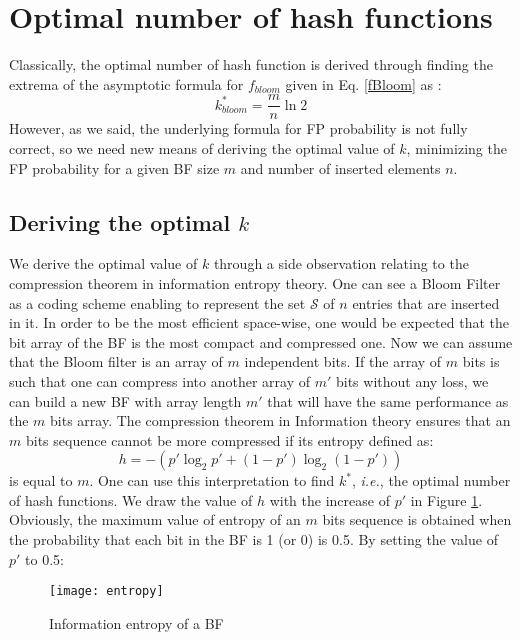 \section{Optimal number of hash functions}
\label{sec:optimalk}
Classically, the optimal number of hash function is derived through finding the extrema of the asymptotic formula for $f_{bloom}$ given in Eq. \ref{fBloom} as :
\begin{equation}
\label{eq:kopt}
k^*_{bloom}=\frac{m}{n}\ln 2
\end{equation}
However, as we said, the underlying formula for FP probability is not fully correct, so we need new means of deriving the optimal value of $k$, minimizing the FP probability for a given BF size $m$ and number of inserted elements $n$.
\subsection{Deriving the optimal $k$}
We derive the optimal value of $k$ through a side observation relating to the compression theorem in information entropy theory. One can see a Bloom Filter as a coding scheme enabling to represent the set $\mathcal{S}$ of $n$ entries that are inserted in it. In order to be the most efficient space-wise, one would be expected that the bit array of the BF is the most compact and compressed one. Now we can assume that the Bloom filter is an array of $m$ independent bits. If the array of $m$ bits is such that one can compress into another array of $m'$ bits without any loss, we can build a new BF with array length $m'$ that will have the same performance as the $m$ bits array. The compression theorem in Information theory \cite{shannon} ensures that an $m$ bits sequence cannot be more compressed if its entropy defined as:
\begin{equation}
h=-\left(p'\log_2 p' +(1-p')\log_2(1-p')\right)
\end{equation}
is equal to $m$. One can use this interpretation to find $k^*$, \textit{i.e.}, the optimal number of hash functions. We draw the value of $h$ with the increase of $p'$ in Figure \ref{fig:entropy}. Obviously, the maximum value of entropy of an $m$ bits sequence is obtained when the probability that each bit in the BF is 1 (or 0) is 0.5. By setting  the value of $p'$ to 0.5:

\begin{figure}
\centering
\texttt{[image: entropy]}
\caption{Information entropy of a BF}
\label{fig:entropy}
\end{figure}

